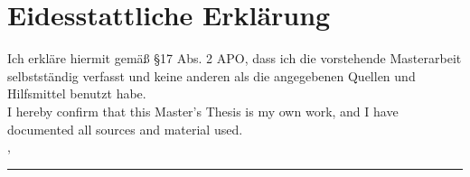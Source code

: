 \chapter{Eidesstattliche Erkl\"arung}
Ich erkläre hiermit gemäß §17 Abs. 2 APO, dass ich die vorstehende Masterarbeit selbstständig
verfasst und keine anderen als die angegebenen Quellen und Hilfsmittel benutzt habe.
\\[1cm]
I hereby confirm that this Master's Thesis is my own work, and I have documented all sources and material used.
\\[6ex]

\city, \submissionDate

\vspace{1.5cm}
\rule[-0.2cm]{5cm}{0.5pt}

\textsc{\authorname}
